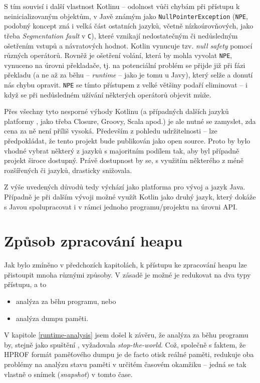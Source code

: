 S tím souvisí i další vlastnost Kotlinu -- odolnost vůči chybám při přístupu k neinicializovaným objektům, v Javě známým jako \texttt{NullPointerException} (\texttt{NPE}, podobný koncept zná i velká část ostatních jazyků, včetně nízkoúrovňových, jako třeba \textit{Segmentation fault} v \texttt{C}), které vznikají nedostatečným či nedůsledným ošetřením vstupů a návratových hodnot. Kotlin vynucuje tzv. \textit{null safety} pomocí různých operátorů. Rovněž je ošetření volání, která by mohla vyvolat \texttt{NPE}, vynuceno na úrovni překladače, tj. na potenciální problém se přijde již při fázi překladu (a ne až za běhu -- \textit{runtime} -- jako je tomu u Javy), který selže a donutí nás chybu opravit. \texttt{NPE} se tímto přístupem z velké většiny podaří eliminovat -- i když se při nedůsledném užívání některých operátorů objevit může.

Přes všechny tyto nesporné výhody Kotlinu (a případných dalších jazyků platformy , jako třeba Closure, Groovy, Scala apod.) je ale nutné se zamyslet, zda cena za ně není příliš vysoká. Především z pohledu udržitelnosti -- lze předpokládat, že tento projekt bude publikován jako open source. Proto by bylo vhodné vybrat některý z jazyků s majoritním podílem tak, aby byl případně projekt široce dostupný. Právě dostupnost by se, s využitím některého z méně rozšířených či  jazyků, drasticky snižovala.

Z výše uvedených důvodů tedy výchází jako platforma pro vývoj  a jazyk Java. Případně je při dalším vývoji možné využít Kotlin jako druhý jazyk, který dokáže s Javou spolupracovat i v rámci jednoho programu/projektu na úrovni API.

\section{Způsob zpracování heapu}
\label{heap-processing}
Jak bylo zmíněno v předchozích kapitolách, k přístupu ke zpracování heapu lze přistoupit mnoha různými způsoby. V zásadě je možné je redukovat na dva typy přístupu, a to

\begin{itemize}
    \item analýza za běhu programu, nebo
    \item analýza dumpu paměti.
\end{itemize}

V kapitole \ref{runtime-analysis} jsem došel k závěru, že analýza za běhu programu by, stejně jako spuštění , vyžadovala \textit{stop-the-world}. Což, společně s faktem, že HPROF formát paměťového dumpu je de facto otisk reálné paměti, redukuje oba problémy na analýzu stavu paměti v určitém časovém okamžiku -- jedná se tak vlastně o snímek (\textit{snapshot}) v tomto čase. 


